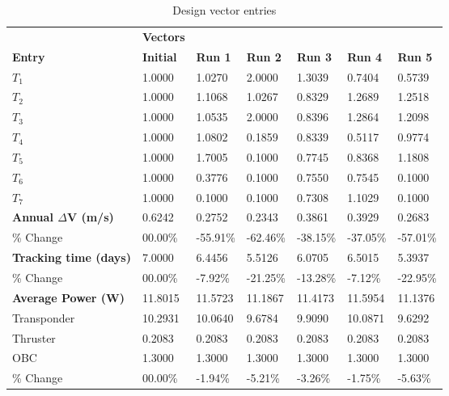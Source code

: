 \begin{table}[H]
\centering
\begin{tabular}{lllllll}
\textbf{} & \cellcolor[HTML]{EFEFEF}\textbf{Vectors} & \textbf{} & \textbf{} & \textbf{} & \textbf{} & \textbf{} \\
\rowcolor[HTML]{EFEFEF} \cellcolor[HTML]{EFEFEF}\textbf{Entry} & \cellcolor[HTML]{EFEFEF}\textbf{Initial} & \cellcolor[HTML]{EFEFEF}\textbf{Run 1} & \cellcolor[HTML]{EFEFEF}\textbf{Run 2} & \cellcolor[HTML]{EFEFEF}\textbf{Run 3} & \cellcolor[HTML]{EFEFEF}\textbf{Run 4} & \cellcolor[HTML]{EFEFEF}\textbf{Run 5} \\
$T_{1}$ & 1.0000 & 1.0270 & 2.0000 & 1.3039 & 0.7404 & 0.5739 \\
$T_{2}$ & 1.0000 & 1.1068 & 1.0267 & 0.8329 & 1.2689 & 1.2518 \\
$T_{3}$ & 1.0000 & 1.0535 & 2.0000 & 0.8396 & 1.2864 & 1.2098 \\
$T_{4}$ & 1.0000 & 1.0802 & 0.1859 & 0.8339 & 0.5117 & 0.9774 \\
$T_{5}$ & 1.0000 & 1.7005 & 0.1000 & 0.7745 & 0.8368 & 1.1808 \\
$T_{6}$ & 1.0000 & 0.3776 & 0.1000 & 0.7550 & 0.7545 & 0.1000 \\
$T_{7}$ & 1.0000 & 0.1000 & 0.1000 & 0.7308 & 1.1029 & 0.1000 \\
\rowcolor[HTML]{EFEFEF} 
\cellcolor[HTML]{EFEFEF}\textbf{Annual $\Delta \boldsymbol{V}$ (m/s)} & \cellcolor[HTML]{EFEFEF}0.6242 & 0.2752 & 0.2343 & 0.3861 & 0.3929 & 0.2683 \\
\% Change & 00.00\% &-55.91\% & -62.46\% & -38.15\% & -37.05\% & -57.01\% \\
\rowcolor[HTML]{EFEFEF} 
\cellcolor[HTML]{EFEFEF}\textbf{Tracking time (days)} & \cellcolor[HTML]{EFEFEF}7.0000 & 6.4456 & 5.5126 & 6.0705 & 6.5015 & 5.3937 \\
\% Change & 00.00\% &-7.92\% & -21.25\% & -13.28\% & -7.12\% & -22.95\% \\
\rowcolor[HTML]{EFEFEF} 
\cellcolor[HTML]{EFEFEF}\textbf{Average Power (W)} & \cellcolor[HTML]{EFEFEF}11.8015 & 11.5723 & 11.1867 & 11.4173 & 11.5954 & 11.1376 \\
Transponder & 10.2931 & 10.0640 & 9.6784 & 9.9090 & 10.0871 & 9.6292 \\
Thruster & 0.2083 & 0.2083 & 0.2083 & 0.2083 & 0.2083 & 0.2083 \\
OBC & 1.3000 & 1.3000 & 1.3000 & 1.3000 & 1.3000 & 1.3000 \\
\% Change & 00.00\% &-1.94\% & -5.21\% & -3.26\% & -1.75\% & -5.63\% \\
\end{tabular}
\caption{Design vector entries}
\label{tab:DesignVectorEntries_default28dur1len3intPropulsion}
\end{table}